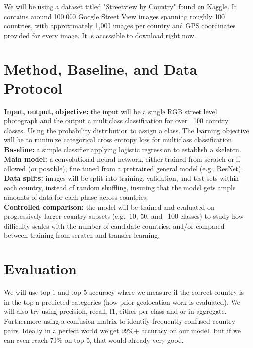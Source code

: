 \documentclass[conference]{IEEEtran}
\begin{document}
We will be using a dataset titled "Streetview by Country" found on Kaggle\cite{b3}. It contains around 100,000 Google Street View images spanning roughly 100 countries, with approximately 1,000 images per country and GPS coordinates provided for every image. It is accessible to download right now.

\section{Method, Baseline, and Data Protocol}

\textbf{Input, output, objective:} the input will be a single RGB street level photograph and the output a multiclass classification
for over ~100 country classes. Using the probability distribution to assign a class. The learning objective will be to minimize categorical cross entropy loss for multiclass classification.\\
\textbf{Baseline:} a simple classifier applying logistic regression to establish a skeleton.\\
\textbf{Main model:} a convolutional neural network, either trained from scratch or if allowed (or possible), fine tuned from a pretrained general model (e.g., ResNet).\\
\textbf{Data splits:} images will be split into training, validation, and test sets within each country, instead of random shuffling, insuring that the model gets ample amounts of data for each phase across countries.\\
\textbf{Controlled comparison:} the model will be trained and evaluated on progressively larger country subsets (e.g., 10, 50, and ~100 classes) to study how difficulty scales with the number of candidate countries, and/or compared between training from scratch and transfer learning.


\section{Evaluation}

We will use top-1 and top-5 accuracy where we measure if the correct country is in the top-n predicted categories (how prior geolocation work is evaluated). We will also try using precision, recall, f1, either per class and or in aggregate. Furthermore using a confusion matrix to identify frequently confused country pairs. Ideally in a perfect world we get 99\%+ accuracy on our model. But if we can even reach 70\% on top 5, that would already very good.
\end{document}
